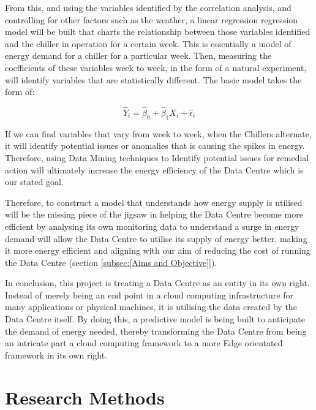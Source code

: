 \documentclass[12pt]{scrartcl}
\begin{document}
 

From this, and using the variables identified by the correlation analysis, and controlling for other factors such as the weather, a linear regression regression model will be built that charts the relationship between those variables identified and the chiller in operation for a certain week. This is essentially a model of energy demand for a chiller for a particular week. Then, measuring the coefficients of these variables week to week, in the form of a natural experiment, will identify variables that are statistically different. The basic model takes the form of:

\begin{equation}
\hat{Y}_i = \hat{\beta}_0 + \hat{\beta}_1 X_i + \hat{\epsilon}_i
\end{equation}


If we can find variables that vary from week to week, when the Chillers alternate, it will identify potential issues or anomalies that is causing the spikes in energy. Therefore, using Data Mining techniques to Identify potential issues for remedial action will ultimately increase the energy efficiency of the Data Centre which is our stated goal.      

 

Therefore, to construct a model that understands how energy supply is utilised will be the missing piece of the jigsaw in helping the Data Centre become more efficient by analysing its own monitoring data to understand a surge in energy demand will allow the Data Centre to utilise its supply of energy better, making it more energy efficient and aligning with our aim of reducing the cost of running the Data Centre (section \ref{subsec:[Aims and Objective]}).

 

In conclusion, this project is treating a Data Centre as an entity in its own right. Instead of merely being an end point in a cloud computing infrastructure for many applications or physical machines, it is utilising the data created by the Data Centre itself. By doing this, a predictive model is being built to anticipate the demand of energy needed, thereby transforming the Data Centre from being an intricate part a cloud computing framework to a more Edge orientated framework in its own right.    

 

\section{Research Methods}
\end{document}
